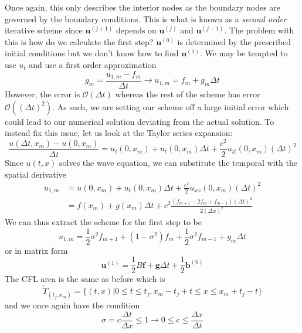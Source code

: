 \documentclass{article}
\newcommand{\vb}[1]{\mathbf{ #1}}
\numberwithin{equation}{section}
\begin{document}
Once again, this only describes the interior nodes as the boundary nodes are governed by the boundary conditions. This is what is known as a \emph{second order} iterative scheme since $\vb{u}^{(j+1)}$ depends on $\vb{u}^{(j)}$ and $\vb{u}^{(j-1)}$. The problem with this is how do we calculate the first step? $\vb u^{(0)}$ is determined by the prescribed initial conditions but we don't know how to find $\vb u^{(1)}$. We may be tempted to use $u_t$ and use a first order approximation 
\begin{equation*}
    g_m=\frac{u_{1,m}-f_m}{\Delta t} \rightarrow u_{1,m}=f_m+g_m\Delta t
\end{equation*}
However, the error is $\mathcal O(\Delta t)$ whereas the rest of the scheme has error $\mathcal O ((\Delta t)^2)$. As such, we are setting our scheme off a large initial error which could lead to our numerical solution deviating from the actual solution. To instead fix this issue, let us look at the Taylor series expansion:
\begin{equation*}
    \frac{u(\Delta t, x_m)-u(0,x_m)}{\Delta t} = u_t(0,x_m)+u_t(0,x_m)\Delta t+\frac{c^2}{2}u_{tt}(0,x_m)(\Delta t)^2
\end{equation*}
Since $u(t,x)$ solves the wave equation, we can substitute the temporal with the spatial derivative 
\begin{equation*}
    \begin{split}
        u_{1,m} &= u(0,x_m)+u_t(0,x_m)\Delta t+\frac{c^2}{2}u_{xx}(0,x_m)(\Delta t)^2 \\
        &=f(x_m)+g(x_m)\Delta t+c^2\frac{(f_{m+1}-2f_m+f_{m-1})(\Delta t)^2}{2(\Delta x)^2}
    \end{split}
\end{equation*}
We can thus extract the scheme for the first step to be 
\begin{equation}
    u_{1,m}=\frac{1}{2}\sigma^2f_{m+1}+(1-\sigma^2)f_m+\frac{1}{2}\sigma^2f_{m-1}+g_m \Delta t
\end{equation}
or in matrix form 
\begin{equation*}
    \vb{u}^{(1)}= \frac{1}{2}B\vb{f}+\vb g \Delta t+\frac{1}{2}\vb b^{(0)}
\end{equation*}
The CFL area is the same as before which is 
\begin{equation*}
    \tilde T_{(t_j,x_m)} = \{(t,x)\big| 0\leq t\leq t_j, x_m-t_j+t\leq x \leq x_m+t_j-t\}
\end{equation*}
and we once again have the condition 
\begin{equation*}
    \sigma=c\frac{\Delta t}{\Delta x} \leq 1 \rightarrow 0 \leq c \leq \frac{\Delta x}{\Delta t}
\end{equation*}
\end{document}

